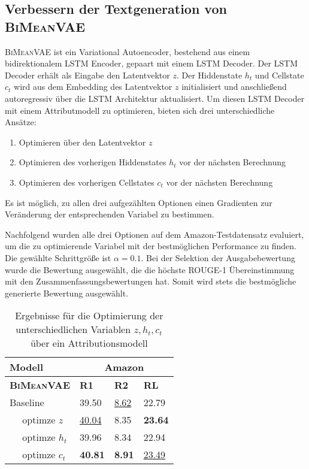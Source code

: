 \subsection{Verbessern der Textgeneration von \textsc{BiMeanVAE}}
\textsc{BiMeanVAE} ist ein Variational Autoencoder, bestehend aus einem bidirektionalem LSTM Encoder, gepaart mit einem LSTM Decoder.
Der LSTM Decoder erhält als Eingabe den Latentvektor $z$. Der Hiddenstate $h_t$ und Cellstate $c_t$ wird aus dem Embedding des Latentvektor $z$ initialisiert und anschließend autoregressiv über die LSTM Architektur aktualisiert.
Um diesen LSTM Decoder mit einem Attributmodell zu optimieren, bieten sich drei unterschiedliche Ansätze:
\begin{enumerate}
    \item Optimieren über den Latentvektor $z$
    \item Optimieren des vorherigen Hiddenstates $h_t$ vor der nächsten Berechnung
    \item Optimieren des vorherigen Cellstates $c_t$ vor der nächsten Berechnung
\end{enumerate}

Es ist möglich, zu allen drei aufgezählten Optionen einen Gradienten zur Veränderung der entsprechenden Variabel zu bestimmen. 

Nachfolgend wurden alle drei Optionen auf dem Amazon-Testdatensatz evaluiert, um die zu optimierende Variabel mit der bestmöglichen Performance zu finden.
Die gewählte Schrittgröße ist $\alpha = 0.1$.
Bei der Selektion der Ausgabebewertung wurde die Bewertung ausgewählt, die die höchste ROUGE-1 Übereinstimmung mit den Zusammenfassungsbewertungen hat.
Somit wird stets die bestmögliche generierte Bewertung ausgewählt.

\begin{table}[h!]
    \centering
    \begin{tabular}{@{}llll@{}}
    \toprule
                    Modell   & \multicolumn{3}{c}{Amazon}              \\ \midrule
    \textbf{\textsc{BiMeanVAE}}    & \textbf{R1} & \textbf{R2} & \textbf{RL} \\ \midrule
    Baseline        & 39.50       & \underline{8.62}     &  22.79     \\
    $\quad$ optimze $z$        &   \underline{40.04}     &   8.35    &    \textbf{23.64}   \\
    $\quad$ optimze $h_t$      &  39.96   &    8.34  &  22.94  \\
    $\quad$ optimze $c_t$      &  \textbf{40.81}   &     \textbf{8.91}  &   \underline{23.49}    \\ \bottomrule
    \end{tabular}
    \caption{Ergebnisse für die Optimierung der unterschiedlichen Variablen $z,h_t,c_t$ über ein Attributionsmodell}
    \label{opt_bimeanvae}
\end{table}

